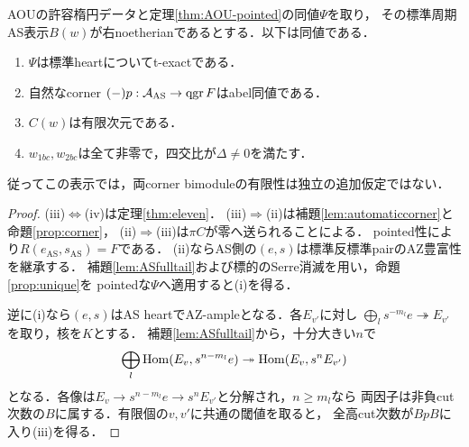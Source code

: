 \begin{theorem}[指定AOU比較の明示的な必要十分条件]\label{thm:AOUexactlocus}
AOUの許容楕円データと定理\ref{thm:AOU-pointed}の同値$\Psi$を取り，
その標準周期AS表示$B(w)$が右noetherianであるとする．以下は同値である．
\begin{enumerate}
\item $\Psi$は標準heartについてt-exactである．
\item 自然なcorner $(-)p:\mathcal A_{\mathrm{AS}}\to\operatorname{qgr} F$はabel同値である．
\item $C(w)$は有限次元である．
\item $w_{1bc},w_{2bc}$は全て非零で，四交比が$\Delta\ne0$を満たす．
\end{enumerate}
従ってこの表示では，両corner bimoduleの有限性は独立の追加仮定ではない．
\end{theorem}
\begin{proof}
(iii)$\Leftrightarrow$(iv)は定理\ref{thm:eleven}．
(iii)$\Rightarrow$(ii)は補題\ref{lem:automaticcorner}と命題\ref{prop:corner}，
(ii)$\Rightarrow$(iii)は$\pi C$が零へ送られることによる．
pointed性により$R(e_{\mathrm{AS}},s_{\mathrm{AS}})=F$である．
(ii)ならAS側の$(e,s)$は標準反標準pairのAZ豊富性を継承する．
補題\ref{lem:ASfulltail}および標的のSerre消滅を用い，命題\ref{prop:unique}を
pointedな$\Psi$へ適用すると(i)を得る．

逆に(i)なら$(e,s)$はAS heartでAZ-ampleとなる．各$E_{v'}$に対し
$\bigoplus_l s^{-m_l}e\twoheadrightarrow E_{v'}$を取り，核を$K$とする．
補題\ref{lem:ASfulltail}から，十分大きい$n$で
\[
 \bigoplus_l\operatorname{Hom}(E_v,s^{n-m_l}e)\twoheadrightarrow\operatorname{Hom}(E_v,s^nE_{v'})
\]
となる．各像は$E_v\to s^{n-m_l}e\to s^nE_{v'}$と分解され，$n\ge m_l$なら
両因子は非負cut次数の$B$に属する．有限個の$v,v'$に共通の閾値を取ると，
全高cut次数が$BpB$に入り(iii)を得る．
\end{proof}

